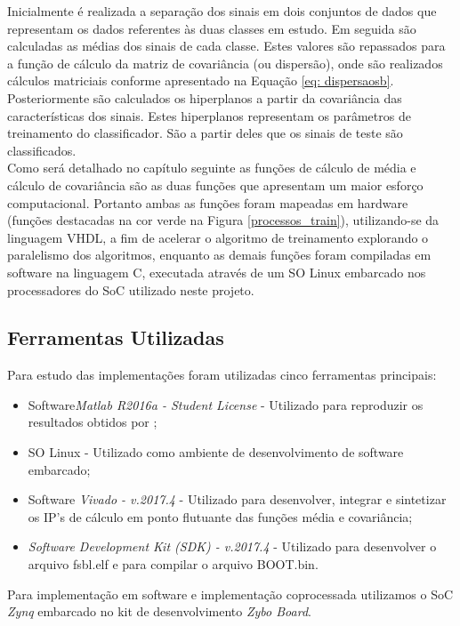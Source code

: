 Inicialmente é realizada a separação dos sinais em dois conjuntos de dados que representam os dados referentes às duas classes em estudo. Em seguida são calculadas as médias dos sinais de cada classe. Estes valores são repassados para a função de cálculo da matriz de covariância (ou dispersão), onde são realizados cálculos matriciais conforme apresentado na Equação \ref{eq: dispersaosb}. Posteriormente são calculados os hiperplanos a partir da covariância das características dos sinais. Estes hiperplanos representam os parâmetros de treinamento do classificador. São a partir deles que os sinais de teste são classificados.\\

Como será detalhado no capítulo seguinte as funções de cálculo de média e cálculo de covariância são as duas funções que apresentam um maior esforço computacional. Portanto ambas as funções foram mapeadas em hardware (funções destacadas na cor verde na Figura \ref{processos_train}), utilizando-se da linguagem VHDL, a fim de acelerar o algoritmo de treinamento explorando o paralelismo dos algoritmos, enquanto as demais funções foram compiladas em software na linguagem C, executada através de um SO Linux embarcado nos processadores do SoC utilizado neste projeto.

\subsection{Ferramentas Utilizadas}
Para estudo das implementações foram utilizadas cinco ferramentas principais:\\
\begin{itemize}
	\item Software\textit{Matlab R2016a - \textit{Student License}} - Utilizado para reproduzir os resultados obtidos por \cite{F.Lotte};
	\item SO Linux - Utilizado como ambiente de desenvolvimento de software embarcado;
	\item Software \textit{Vivado - v.2017.4} - Utilizado para desenvolver, integrar e sintetizar os IP's de cálculo em ponto flutuante das funções média e covariância;
	\item \textit{Software Development Kit (SDK) - v.2017.4} - Utilizado para desenvolver o arquivo fsbl.elf e para compilar o arquivo BOOT.bin.
\end{itemize}

Para implementação em software e implementação coprocessada utilizamos o SoC \textit{Zynq} embarcado no kit de desenvolvimento \textit{Zybo Board}.


